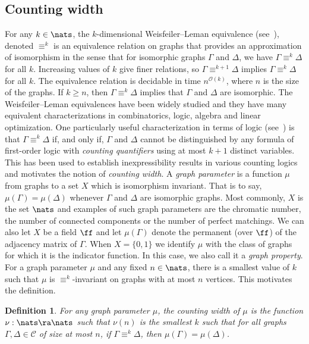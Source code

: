 \documentclass[11pt]{article}
\newtheorem{definition}[theorem]{Definition}
\begin{document}
\subsection{Counting width}
For any $k \in \nats$, the $k$-dimensional Weisfeiler--Leman equivalence
(see~\cite{CFI92}), denoted $\equiv^k$ is an equivalence relation on graphs that
provides an approximation
%
of isomorphism in the sense that for isomorphic
graphs $\Gamma$ and $\Delta$, we have $\Gamma \equiv^k \Delta$ for all $k$. Increasing values of $k$
give finer relations, so $\Gamma \equiv^{k+1} \Delta$ implies $\Gamma \equiv^k \Delta$ for all $k$.
The equivalence relation is decidable in time $n^{\mathcal{O}(k)}$, where $n$ is
the size of the graphs. If $k \geq n$, then $\Gamma \equiv^k \Delta$ implies that $\Gamma$ and
$\Delta$ are isomorphic. The Weisfeiler--Leman equivalences have been widely studied
and they have many equivalent characterizations in combinatorics, logic, algebra
and linear optimization.   One particularly useful characterization in
terms of logic (see~\cite{CFI92}) is that $\Gamma \equiv^k \Delta$ if,
and only if, $\Gamma$ and $\Delta$ cannot be distinguished by any
formula of first-order logic with \emph{counting quantifiers} using at most $k+1$ distinct variables.  This has been used to  establish
inexpressibility results in various counting logics and motivates the notion of
\emph{counting width}.
A \emph{graph parameter} is a function $\mu$ from graphs to a set $X$ which is
isomorphism invariant.  That is to say, $\mu(\Gamma) = \mu(\Delta)$ whenever $\Gamma$ and $\Delta$ are isomorphic graphs.  Most commonly, $X$ is the set $\nats$ and examples of such graph parameters are the chromatic number, the number of
connected components or the number of perfect matchings.  We can also
let $X$ be a field $\ff$ and let $\mu(\Gamma)$ denote the permanent
(over $\ff$) of the adjacency matrix of $\Gamma$.  When $X = \{0,1\}$
we identify $\mu$ with the class of graphs for which it is the
indicator function.  In this case, we also call it a \emph{graph property}.
For a graph parameter
$\mu$ and any fixed $n \in \nats$, there is a smallest value of $k$ such that
$\mu$ is $\equiv^k$-invariant on graphs with at most $n$ vertices. This motivates the definition.
\begin{definition}\label{def:counting-width}
  For any graph parameter $\mu$, the \emph{counting width} of $\mu$ is the
  function $\nu : \nats \ra \nats$ such that $\nu(n)$
  is the smallest $k$ such that for all graphs $\Gamma, \Delta \in \mathcal{C}$ of size
  at most $n$, if $\Gamma \equiv^{k} \Delta$, then $\mu(\Gamma) = \mu(\Delta)$.
\end{definition}
\end{document}
